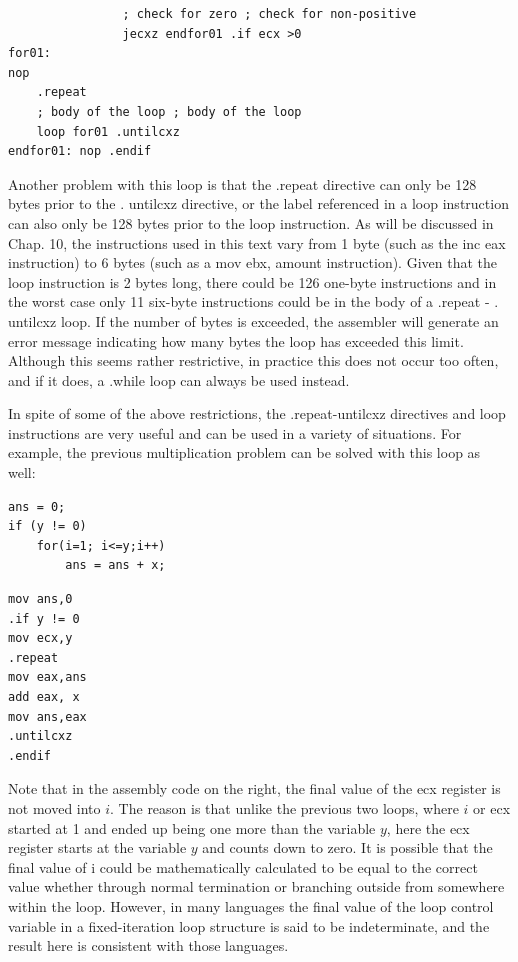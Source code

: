 \documentclass[10pt]{book}
\begin{document}
\begin{verbatim}
                ; check for zero ; check for non-positive
                jecxz endfor01 .if ecx >0
for01:
nop
    .repeat
    ; body of the loop ; body of the loop
    loop for01 .untilcxz
endfor01: nop .endif
\end{verbatim}

Another problem with this loop is that the .repeat directive can only be 128 bytes prior to the . untilcxz directive, or the label referenced in a loop instruction can also only be 128 bytes prior to the loop instruction. As will be discussed in Chap. 10, the instructions used in this text vary from 1 byte (such as the inc eax instruction) to 6 bytes (such as a mov ebx, amount instruction). Given that the loop instruction is 2 bytes long, there could be 126 one-byte instructions and in the worst case only 11 six-byte instructions could be in the body of a .repeat - . untilcxz loop. If the number of bytes is exceeded, the assembler will generate an error message indicating how many bytes the loop has exceeded this limit. Although this seems rather restrictive, in practice this does not occur too often, and if it does, a .while loop can always be used instead.

In spite of some of the above restrictions, the .repeat-untilcxz directives and loop instructions are very useful and can be used in a variety of situations. For example, the previous multiplication problem can be solved with this loop as well:

\begin{verbatim}
ans = 0;
if (y != 0)
    for(i=1; i<=y;i++)
        ans = ans + x;
\end{verbatim}

\begin{verbatim}
mov ans,0
.if y != 0
mov ecx,y
.repeat
mov eax,ans
add eax, x
mov ans,eax
.untilcxz
.endif
\end{verbatim}

Note that in the assembly code on the right, the final value of the ecx register is not moved into $i$. The reason is that unlike the previous two loops, where $i$ or ecx started at 1 and ended up being one more than the variable $y$, here the ecx register starts at the variable $y$ and counts down to zero. It is possible that the final value of i could be mathematically calculated to be equal to the correct value whether through normal termination or branching outside from somewhere within the loop. However, in many languages the final value of the loop control variable in a fixed-iteration loop structure is said to be indeterminate, and the result here is consistent with those languages.
\end{document}
